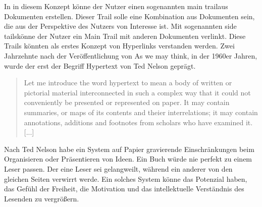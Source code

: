 In in diesem Konzept könne der Nutzer einen sogenannten \glqq main trail\grqq{ }aus Dokumenten erstellen. Dieser Trail solle eine Kombination aus Dokumenten sein, die aus der Perspektive des Nutzers von Interesse ist. Mit sogenannten \glqq side tails\grqq{ }könne der Nutzer ein Main Trail mit anderen Dokumenten \glqq verlinkt\grqq{ }\cite[Section 7]{Bush1945}. Diese Trails könnten als erstes Konzept von Hyperlinks verstanden werden. Zwei Jahrzehnte nach der Veröffentlichung von \glqq As we may think\grqq{ }, in der 1960er Jahren, wurde der erst der Begriff Hypertext von Ted Nelson geprägt. 

\begin{quote}
	\glqq Let me introduce the word hypertext to mean a body of written or pictorial material interconnected in such a complex way that it could not conveniently be presented or represented on paper. It may contain summaries, or maps of its contents and theier interrelations; it may contain annotations, additions and footnotes from scholars who have examined it. [...]\grqq{ }\cite{Nelson1965}
\end{quote}

Nach Ted Nelson habe ein System auf Papier gravierende Einschränkungen beim Organisieren oder Präsentieren von Ideen. Ein Buch würde nie perfekt zu einem Leser passen. Der eine Leser sei gelangweilt, während ein anderer von den gleichen Seiten verwirrt werde. \glqq Ein solches System könne das Potenzial haben, das Gefühl der Freiheit, die Motivation und das intellektuelle Verständnis des Lesenden zu vergrößern\grqq{ }\cite{Nelson1965}. 

